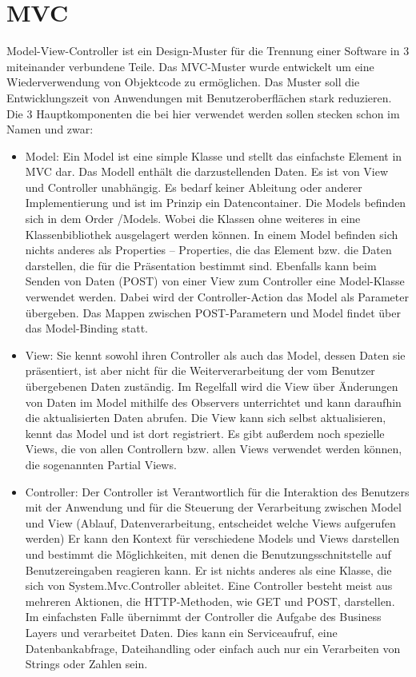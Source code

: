 \section{MVC}
Model-View-Controller ist ein Design-Muster für die Trennung einer Software in 3 miteinander verbundene Teile. Das MVC-Muster wurde entwickelt um eine Wiederverwendung von Objektcode zu ermöglichen. Das Muster soll die Entwicklungszeit von Anwendungen mit Benutzeroberflächen stark  reduzieren. 
Die 3 Hauptkomponenten die bei hier verwendet werden sollen stecken schon im Namen und zwar: 
\begin{itemize}

\item Model: Ein Model ist eine simple Klasse und stellt das einfachste Element in MVC dar. Das Modell enthält die darzustellenden Daten. Es ist von View und Controller unabhängig. Es bedarf keiner Ableitung oder anderer Implementierung und ist im Prinzip ein Datencontainer. Die Models befinden sich in dem Order /Models. Wobei die Klassen ohne weiteres in eine Klassenbibliothek ausgelagert werden können. In einem Model befinden sich nichts anderes als Properties – Properties, die das Element bzw. die Daten darstellen, die für die Präsentation bestimmt sind. Ebenfalls kann beim Senden von Daten (POST) von einer View zum Controller eine Model-Klasse verwendet werden. Dabei wird der Controller-Action das Model als Parameter übergeben. Das Mappen zwischen POST-Parametern und Model findet über das Model-Binding statt.

\item View: Sie kennt sowohl ihren Controller als auch das Model, dessen Daten sie präsentiert, ist aber nicht für die Weiterverarbeitung der vom Benutzer übergebenen Daten zuständig. Im Regelfall wird die View über Änderungen von Daten im Model mithilfe des Observers unterrichtet und kann daraufhin die aktualisierten Daten abrufen. Die View kann sich selbst aktualisieren, kennt das Model und ist dort registriert.
Es gibt außerdem noch spezielle Views, die von allen Controllern bzw. allen Views verwendet werden können, die sogenannten Partial Views.

\item Controller: Der Controller ist Verantwortlich für die Interaktion des Benutzers mit der Anwendung und für die Steuerung der Verarbeitung zwischen Model und View (Ablauf, Datenverarbeitung, entscheidet welche Views aufgerufen werden)
Er kann den Kontext für verschiedene Models und Views darstellen und bestimmt die Möglichkeiten, mit denen die Benutzungsschnitstelle auf Benutzereingaben reagieren kann.
Er ist nichts anderes als eine Klasse, die sich von System.Mvc.Controller ableitet. 
Eine Controller besteht meist aus mehreren Aktionen, die HTTP-Methoden, wie GET und POST, darstellen. Im einfachsten Falle übernimmt der Controller die Aufgabe des Business Layers und verarbeitet Daten. Dies kann ein Serviceaufruf, eine Datenbankabfrage, Dateihandling oder einfach auch nur ein Verarbeiten von Strings oder Zahlen sein.
\end{itemize}
